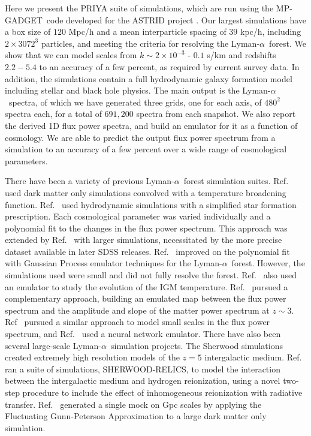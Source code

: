 \documentclass[a4paper,11pt]{article}
\newcommand{\Lya}{Lyman-$\alpha$}
\newcommand{\mpgadget}{{\small MP-GADGET}}
\begin{document}
Here we present the PRIYA suite of simulations, which are run using the \mpgadget~code developed for the ASTRID project \cite{Ni:2021, Bird:2022}. Our largest simulations have a box size of $120$ Mpc/h and a mean interparticle spacing of $39$ kpc/h, including $2\times 3072^3$ particles, and meeting the criteria for resolving the \Lya~forest.
We show that we can model scales from $k \sim 2\times 10^{-3}$ - $0.1$ s/km and redshifts $2.2 - 5.4$ to an accuracy of a few percent, as required by current survey data. In addition, the simulations contain a full hydrodynamic galaxy formation model including stellar and black hole physics. The main output is the \Lya~spectra, of which we have generated three grids, one for each axis, of $480^2$ spectra each, for a total of $691,200$ spectra from each snapshot. We also report the derived 1D flux power spectra, and build an emulator for it as a function of cosmology. We are able to predict the output flux power spectrum from a simulation to an accuracy of a few percent over a wide range of cosmological parameters.

There have been a variety of previous \Lya~forest simulation suites. Ref.~\cite{McDonald:2005pk} used dark matter only simulations convolved with a temperature broadening function. Ref.~\cite{Viel:2006} used hydrodynamic simulations with a simplified star formation prescription. Each cosmological parameter was varied individually and a polynomial fit to the changes in the flux power spectrum. This approach was extended by Ref.~\cite{Borde:2014, Rossi:2020} with larger simulations, necessitated by the more precise dataset available in later SDSS releases. Ref.~\cite{Bird:2019} improved on the polynomial fit with Gaussian Process emulator techniques for the \Lya~forest. However, the simulations used were small and did not fully resolve the forest. Ref.~\cite{Walther:2019} also used an emulator to study the evolution of the IGM temperature. Ref.~\cite{Pedersen:2021, Pedersen:2022} pursued a complementary approach, building an emulated map between the flux power spectrum and the amplitude and slope of the matter power spectrum at $z\sim 3$. Ref~\cite{Esposito:2022} pursued a similar approach to model small scales in the flux power spectrum, and Ref.~\cite{Cabayol:2023} used a neural network emulator. There have also been several large-scale \Lya~simulation projects. The Sherwood simulations \cite{Bolton:2017} created extremely high resolution models of the $z=5$ intergalactic medium. Ref.~\cite{Puchwein:2022} ran a suite of simulations, SHERWOOD-RELICS, to model the interaction between the intergalactic medium and hydrogen reionization, using a novel two-step procedure to include the effect of inhomogeneous reionization with radiative transfer. Ref.~\cite{Hadzhiyska:2023} generated a single mock on Gpc scales by applying the Fluctuating Gunn-Peterson Approximation to a large dark matter only simulation.
\end{document}
